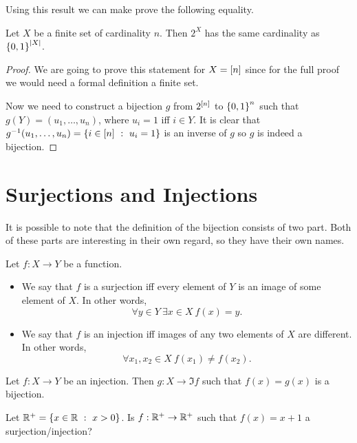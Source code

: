 Using this result we can make prove the following equality.
\begin{corollary}
\label{corollary:power-set-and-set-of-binary-strings}
    Let $X$ be a finite set of cardinality $n$. Then $2^X$ has the same
    cardinality as $\set{0, 1}^{\cardinality{X}}$.
\end{corollary}
\begin{proof}
  We are going to prove this statement for $X = {[{n}]}$ since for the full
  proof we would need a formal definition a finite set.

  Now we need to construct a bijection $g$ from $2^{{[{n}]}}$ to
  $\set{0, 1}^n$ such that $g(Y) = (u_1, \dots, u_n)$, where $u_i = 1$ iff $i \in Y$.
  It is clear that $g^{-1}(u_1, \dots, u_n) = \set[u_i = 1]{i \in \range{n}}$ is an
  inverse of $g$ so $g$ is indeed a bijection.
\end{proof}

\section{Surjections and Injections}

It is possible to note that the definition of the bijection consists of two part.
Both of these parts are interesting in their own regard, so they have their own
names.
\begin{definition}
    Let $f : X \to Y$ be a function.
    \begin{itemize}
        \item We say that $f$ is a surjection iff every element of $Y$ is an image
            of some element of $X$. In other words,
            \[
                \forall y \in Y~\exists x \in X\ f(x) = y.
            \]
        \item We say that $f$ is an injection iff images of any two elements
            of $X$ are different. In other words,
            \[
                \forall x_1, x_2 \in X\ f(x_1) \neq f(x_2).
            \]
    \end{itemize}
\end{definition}

\begin{remark}
    Let $f : X \to Y$ be an injection. Then $g : X \to \Im f$ such that
    $f(x) = g(x)$ is a bijection.
\end{remark}

\begin{exercise}
    Let $\R^+ = \set[x > 0]{x \in \R}$. Is $f : {\mathbb{R}}^+ \to {\mathbb{R}}^+$ such that
    $f(x) = x + 1$ a surjection/injection?
\end{exercise}

